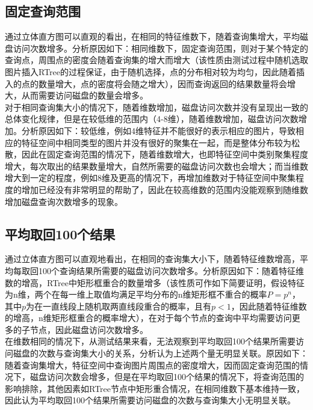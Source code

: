 \documentclass[12pt]{article}
\begin{document}
  	\subsection*{固定查询范围}
  		通过立体直方图可以直观的看出，在相同的特征维数下，随着查询集增大，平均磁盘访问次数增多。分析原因如下：相同维数下，固定查询范围，则对于某个特定的查询点，周围点的密度会随着查询集的增大而增大（该性质由测试过程中随机选取图片插入RTree的过程保证，由于随机选择，点的分布相对较为均匀，因此随着插入的点的数量增大，点的密度将会随之增大），因而查询返回的结果数量将会增大，从而需要访问磁盘的数量会增多。\\
  		对于相同查询集大小的情况下，随着维数增加，磁盘访问次数并没有呈现出一致的总体变化规律，但是在较低维的范围内（4-8维），随着维数增加，磁盘访问次数增加。分析原因如下：较低维，例如4维特征并不能很好的表示相应的图片，导致相应的特征空间中相同类型的图片并没有很好的聚集在一起，而是整体分布较为松散，因此在固定查询范围的情况下，随着维数增大，也即特征空间中类别聚集程度增大，每次取出的结果数量增大，自然所需要的磁盘访问次数也会增大；而当维数增大到一定的程度，例如8维及更高的情况下，再增加维数对于特征空间中聚集程度的增加已经没有非常明显的帮助了，因此在较高维数的范围内没能观察到随维数增加磁盘查询次数增多的现象。
  	\subsection*{平均取回100个结果}
  		通过立体直方图可以直观地看出，在相同的查询集大小下，随着特征维数增高，平均每取回100个查询结果所需要的磁盘访问次数增多。分析原因如下：随着特征维数的增高，RTree中矩形框重合的数量增多（该性质可作如下简要证明，假设特征为n维，两个在每一维上取值均满足平均分布的n维矩形框不重合的概率$P=p^n$，其中$p$为在一直线段上随机取两直线段重合的概率，且有$p<1$，因此随着特征维数的增高，n维矩形框重合的概率增大），在对于每个节点的查询中平均需要访问更多的子节点，因此磁盘访问次数增多。\\
  		在维数相同的情况下，从测试结果来看，无法观察到平均取回100个结果所需要访问磁盘的次数与查询集大小的关系，分析认为上述两个量无明显关联。原因如下：随着查询集增大，特征空间中查询图片周围点的密度增大，因而固定查询范围的情况下，磁盘访问次数会增多，但是在平均取回100个结果的情况下，将查询范围的影响排除，其他因素如RTree节点中矩形重合情况，在相同维数下基本维持一致，因此认为平均取回100个结果所需要访问磁盘的次数与查询集大小无明显关联。
\end{document}
